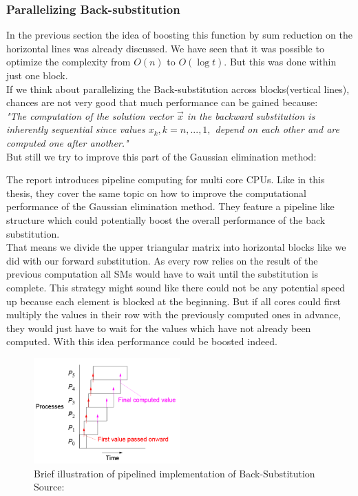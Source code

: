 \documentclass[draft, final]{vutinfth} %
\begin{document}
			\subsubsection{Parallelizing Back-substitution}
				In the previous section the idea of boosting this function by sum reduction on the horizontal lines was already discussed. We have seen that it was possible to optimize the complexity from $O(n)$ to $O(\log t)$. But this was done within just one block.\\
				If we think about parallelizing the Back-substitution across blocks(vertical lines), chances are not very good that much performance can be gained because:\\
				\textit{"The computation of the solution vector $\vec{x}$ in the backward substitution is inherently sequential since values $x_{k}, k = n, ...,1,$ depend on each other and are computed one after another."}\cite[422]{opac-b1133063}\\
				But still we try to improve this part of the Gaussian elimination method:

				The report \cite{pipelinecomp} introduces pipeline computing for multi core CPUs. Like in this thesis, they cover the same topic on how to improve the computational performance of the Gaussian elimination method. They feature a pipeline like structure which could potentially boost the overall performance of the back substitution.\\
				That means we divide the upper triangular matrix into horizontal blocks like we did with our forward substitution. As every row relies on the result of the previous computation all SMs would have to wait until the substitution is complete. This strategy might sound like there could not be any potential speed up because each element is blocked at the beginning. But if all cores could first multiply the values in their row with the previously computed ones in advance, they would just have to wait for the values which have not already been computed. With this idea performance could be boosted indeed.\\

				\begin{figure}[!ht]
				    \centering
				    \includegraphics[width=0.5\textwidth,keepaspectratio=true]{images/pipeline.png}
				    \caption{Brief illustration of pipelined implementation of Back-Substitution Source: \cite{pipelinecomp}}
				    \label{fig:pipeline}
				\end{figure}
\end{document}
